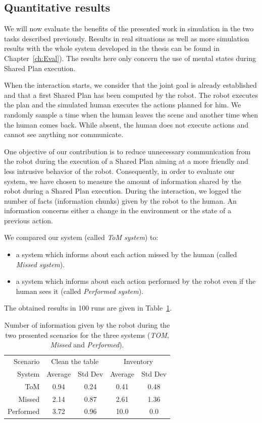 \documentclass[english,a4paper,11pt,twoside]{StyleThese}
\begin{document}
\subsection{Quantitative results}

We will now evaluate the benefits of the presented work in simulation in the two tasks described previously. Results in real situations as well as more simulation results with the whole system developed in the thesis can be found in Chapter~\ref{ch:Eval}). The results here only concern the use of mental states during Shared Plan execution.

When the interaction starts, we consider that the joint goal is already established and that a first Shared Plan has been computed by the robot. The robot executes the plan and the simulated human executes the actions planned for him. We randomly sample a time when the human leaves the scene and another time when the human comes back. While absent, the human does not execute actions and cannot see anything nor communicate.

One objective of our contribution is to reduce unnecessary communication from the robot during the execution of a Shared Plan aiming at a more friendly and less intrusive behavior of the robot. Consequently, in order to evaluate our system, we have chosen to measure the amount of information shared by the robot during a Shared Plan execution. During the interaction, we logged the number of facts (information chunks) given by the robot to the human. An information concerns either a change in the environment or the state of a previous action. 

We compared our system (called \textit{ToM system}) to:
\begin{itemize}
\item a system which informs about each action missed by the human (called \textit{Missed system}).
\item a system which informs about each action performed by the robot even if the human sees it (called \textit{Performed system}).
\end{itemize}

The obtained results in 100 runs are given in Table~\ref{table:results}.

\begin{table}[ht]
\begin{center}
\begin{tabular}{|r||c|c||c|c|}
\hline
 Scenario & \multicolumn{2}{c||}{Clean the table} & \multicolumn{2}{c|}{Inventory}\\
\cline{2-5} 
System & Average & Std Dev & Average & Std Dev\\
\hline
\hline
ToM & 0.94 & 0.24 & 0.41 & 0.48\\
\hline
Missed & 2.14 & 0.87 & 2.61 & 1.36\\
\hline
Performed & 3.72 & 0.96 & 10.0 & 0.0\\
\hline
\end{tabular}
\end{center}
\caption{Number of information given by the robot during the two presented scenarios for the three systems (\textit{TOM}, \textit{Missed} and \textit{Performed}).}
\label{table:results}
\end{table}
\end{document}
